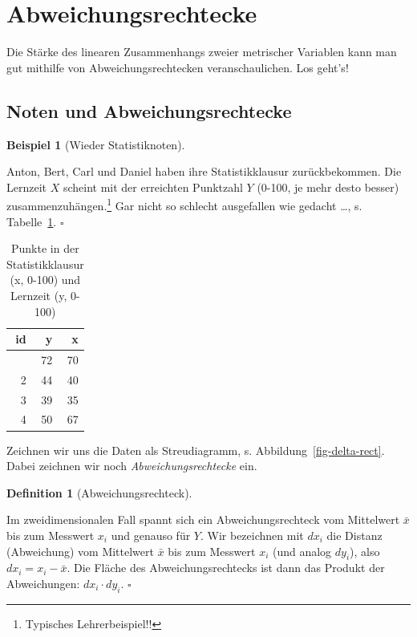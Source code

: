 \documentclass[
  letterpaper,
  twoside,
  open=any]{scrbook}
\theoremstyle{definition}
\theoremstyle{definition}
\newtheorem{example}{Beispiel}[chapter]
\theoremstyle{definition}
\newtheorem{definition}{Definition}[chapter]
\theoremstyle{remark}
\begin{document}
\section{Abweichungsrechtecke}\label{sec-cov}

Die Stärke des linearen Zusammenhangs zweier metrischer Variablen kann
man gut mithilfe von Abweichungsrechtecken veranschaulichen. Los geht's!

\subsection{Noten und
Abweichungsrechtecke}\label{noten-und-abweichungsrechtecke}

\begin{example}[Wieder
Statistiknoten]\protect\hypertarget{exm-noten2}{}\label{exm-noten2}

Anton, Bert, Carl und Daniel haben ihre Statistikklausur zurückbekommen.
Die Lernzeit \(X\) scheint mit der erreichten Punktzahl \(Y\) (0-100, je
mehr desto besser) zusammenzuhängen.\footnote{ Typisches
  Lehrerbeispiel!!} Gar nicht so schlecht ausgefallen wie gedacht
\ldots, s. Tabelle~\ref{tbl-noten2}. \(\square\)

\end{example}

\begin{longtable}[]{@{}rrr@{}}

\caption{\label{tbl-noten2}Punkte in der Statistikklausur (x, 0-100) und
Lernzeit (y, 0-100)}

\tabularnewline

\toprule\noalign{}
id & y & x \\
\midrule\noalign{}
\endhead
\bottomrule\noalign{}
\endlastfoot
1 & 72 & 70 \\
2 & 44 & 40 \\
3 & 39 & 35 \\
4 & 50 & 67 \\

\end{longtable}

Zeichnen wir uns die Daten als Streudiagramm, s.
Abbildung~\ref{fig-delta-rect}. Dabei zeichnen wir noch
\emph{Abweichungsrechtecke} ein.

\begin{definition}[Abweichungsrechteck]\protect\hypertarget{def-abweichungsrechteck}{}\label{def-abweichungsrechteck}

Im zweidimensionalen Fall spannt sich ein Abweichungsrechteck vom
Mittelwert \(\bar{x}\) bis zum Messwert \(x_i\) und genauso für \(Y\).
Wir bezeichnen mit \(dx_i\) die Distanz (Abweichung) vom Mittelwert
\(\bar{x}\) bis zum Messwert \(x_i\) (und analog \(dy_i\)), also
\(dx_i = x_i - \bar{x}\). Die Fläche des Abweichungsrechtecks ist dann
das Produkt der Abweichungen: \(dx_i \cdot dy_i\). \(\square\)

\end{definition}
\end{document}
